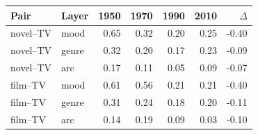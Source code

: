 \begin{tabular}{l l r r r r r}
\toprule
Pair & Layer & 1950 & 1970 & 1990 & 2010 & $\Delta$ \\
\midrule
novel--TV & mood & 0.65 & 0.32 & 0.20 & 0.25 & -0.40 \\
novel--TV & genre & 0.32 & 0.20 & 0.17 & 0.23 & -0.09 \\
novel--TV & arc & 0.17 & 0.11 & 0.05 & 0.09 & -0.07 \\
film--TV & mood & 0.61 & 0.56 & 0.21 & 0.21 & -0.40 \\
film--TV & genre & 0.31 & 0.24 & 0.18 & 0.20 & -0.11 \\
film--TV & arc & 0.14 & 0.19 & 0.09 & 0.03 & -0.10 \\
\bottomrule
\end{tabular}